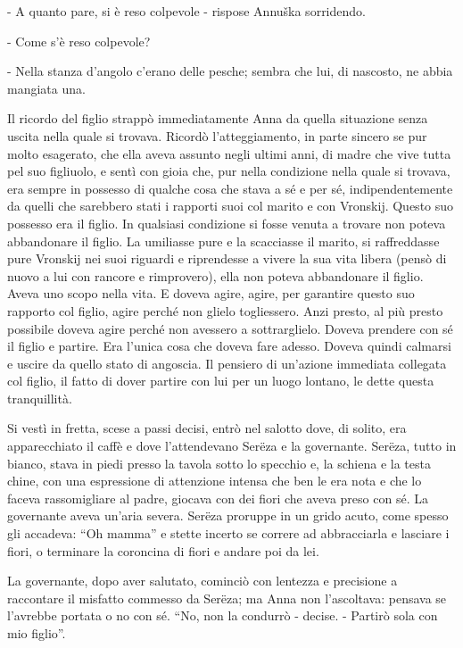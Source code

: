 - A quanto pare, si è reso colpevole - rispose Annuška sorridendo. 

- Come s'è reso colpevole? 

- Nella stanza d'angolo c'erano delle pesche; sembra che lui, di nascosto, ne abbia mangiata una. 

Il ricordo del figlio strappò immediatamente Anna da quella situazione senza uscita nella quale si trovava. Ricordò l'atteggiamento, in parte sincero se pur molto esagerato, che ella aveva assunto negli ultimi anni, di madre che vive tutta pel suo figliuolo, e sentì con gioia che, pur nella condizione nella quale si trovava, era sempre in possesso di qualche cosa che stava a sé e per sé, indipendentemente da quelli che sarebbero stati i rapporti suoi col marito e con Vronskij. Questo suo possesso era il figlio. In qualsiasi condizione si fosse venuta a trovare non poteva abbandonare il figlio. La umiliasse pure e la scacciasse il marito, si raffreddasse pure Vronskij nei suoi riguardi e riprendesse a vivere la sua vita libera (pensò di nuovo a lui con rancore e rimprovero), ella non poteva abbandonare il figlio. Aveva uno scopo nella vita. E doveva agire, agire, per garantire questo suo rapporto col figlio, agire perché non glielo togliessero. Anzi presto, al più presto possibile doveva agire perché non avessero a sottrarglielo. Doveva prendere con sé il figlio e partire. Era l'unica cosa che doveva fare adesso. Doveva quindi calmarsi e uscire da quello stato di angoscia. Il pensiero di un'azione immediata collegata col figlio, il fatto di dover partire con lui per un luogo lontano, le dette questa tranquillità. 

Si vestì in fretta, scese a passi decisi, entrò nel salotto dove, di solito, era apparecchiato il caffè e dove l'attendevano Serëza e la governante. Serëza, tutto in bianco, stava in piedi presso la tavola sotto lo specchio e, la schiena e la testa chine, con una espressione di attenzione intensa che ben le era nota e che lo faceva rassomigliare al padre, giocava con dei fiori che aveva preso con sé. La governante aveva un'aria severa. Serëza proruppe in un grido acuto, come spesso gli accadeva: ``Oh mamma'' e stette incerto se correre ad abbracciarla e lasciare i fiori, o terminare la coroncina di fiori e andare poi da lei. 

La governante, dopo aver salutato, cominciò con lentezza e precisione a raccontare il misfatto commesso da Serëza; ma Anna non l'ascoltava: pensava se l'avrebbe portata o no con sé. ``No, non la condurrò - decise. - Partirò sola con mio figlio''. 

